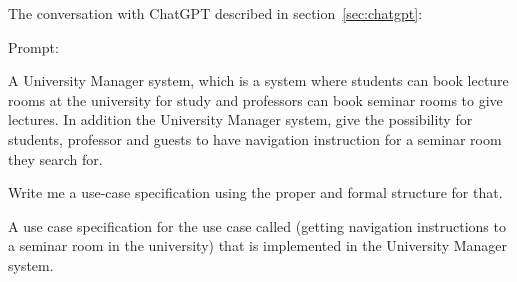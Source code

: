 \documentclass[conference,onecolumn]{IEEEtran}
\begin{document}
The conversation with ChatGPT described in section~\ref{sec:chatgpt}:

Prompt:
\begin{framed}
	\small
	A University Manager system, which is a system where students can book lecture rooms at the university for study and professors can book seminar rooms to give lectures. In addition the University Manager system, give the possibility for students, professor and guests  to have navigation instruction for a seminar room they search for.
	
	Write me a use-case specification using the proper and formal structure for that.
	
	A use case specification for the use case called (getting navigation instructions to a seminar room in the university) that is implemented in the University Manager system.
\end{framed}
\end{document}
